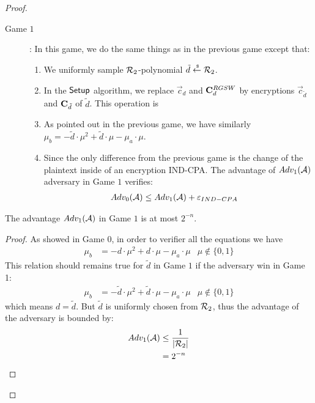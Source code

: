 \begin{proof}
\begin{description}
\begin{description}
    \item[\textsf{Game} $1$]: In this game, we do the same things as in the previous game except that:
      \begin{enumerate}
      \item We uniformly sample ${\mathcal{R}}_2$-polynomial $\tilde{d} \stackrel{{\scriptscriptstyle \mkern4mu \$}}{\gets} {\mathcal{R}}_2$.
      \item In the ${\mathsf{Setup}}$ algorithm, we replace $\vec{c}_d$ and $\mathbf{C}_d^{RGSW}$ by encryptions $\vec{c}_{\tilde{d}}$ and $\mathbf{C}_{\tilde{d}}$ of $\tilde{d}$.
        This operation is
      \item As pointed out in the previous game, we have similarly $\mu_b = - \tilde{d} \cdot \mu^2 + \tilde{d} \cdot \mu - \mu_a \cdot \mu$.
      \item Since the only difference from the previous game is the change of the plaintext inside of an encryption IND-CPA.
        The advantage of $Adv_1(\mathcal{A})$ adversary in \textsf{Game} $1$ verifies:
        \begin{align*}
          Adv_0(\mathcal{A}) &\leq Adv_1(\mathcal{A}) + \varepsilon_{IND-CPA}
        \end{align*}
      \end{enumerate}
    \end{description}

    \begin{lemma}
      The advantage $Adv_1(\mathcal{A})$ in \textsf{Game} $1$ is at most $2^{-n}$.
    \end{lemma}
    \begin{proof}
      As showed in \textsf{Game} $0$, in order to verifier all the equations we have
      \begin{align*}
        \mu_b &= - d \cdot \mu^2 + d \cdot \mu - \mu_a \cdot \mu & \mu \not \in \{0,1\}
      \end{align*}
      This relation should remains true for $\tilde{d}$ in \textsf{Game} $1$ if the adversary win in \textsf{Game} 1:
      \begin{align*}
        \mu_b &= - \tilde{d} \cdot \mu^2 + \tilde{d} \cdot \mu - \mu_a \cdot \mu &\mu \not \in \{0,1\}
      \end{align*}
      which means $d = \tilde{d}$.
      But $\tilde{d}$ is uniformly chosen from ${\mathcal{R}}_2$, thus the advantage of the adversary is bounded by:
      \begin{align*}
        Adv_1(\mathcal{A}) &\leq \frac{1}{|{\mathcal{R}}_2|}\\
        &= 2^{-n}
      \end{align*}
      
    \end{proof}

    
  \end{description}

\end{proof}

